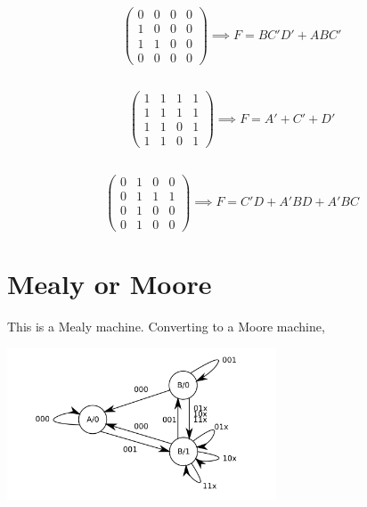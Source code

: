 \documentclass{article}
\begin{document}
\subsection{}

\begin{equation}
    \begin{pmatrix}
        0 & 0 & 0 & 0 \\
        1 & 0 & 0 & 0 \\
        1 & 1 & 0 & 0 \\
        0 & 0 & 0 & 0
    \end{pmatrix}
    \implies F = BC'D' + ABC'
\end{equation}

\subsection{}

\begin{equation}
    \begin{pmatrix}
        1 & 1 & 1 & 1 \\
        1 & 1 & 1 & 1 \\
        1 & 1 & 0 & 1 \\
        1 & 1 & 0 & 1
    \end{pmatrix}
    \implies F = A' + C' + D'
\end{equation}

\subsection{}

\begin{equation}
    \begin{pmatrix}
        0 & 1 & 0 & 0 \\
        0 & 1 & 1 & 1 \\
        0 & 1 & 0 & 0 \\
        0 & 1 & 0 & 0
    \end{pmatrix}
    \implies F = C'D + A'BD + A'BC
\end{equation}

\newpage
\section{Mealy or Moore}

This is a Mealy machine.
Converting to a Moore machine,
\begin{center}
    \includegraphics[width=0.6\textwidth]{q4.png}
\end{center}
\end{document}
